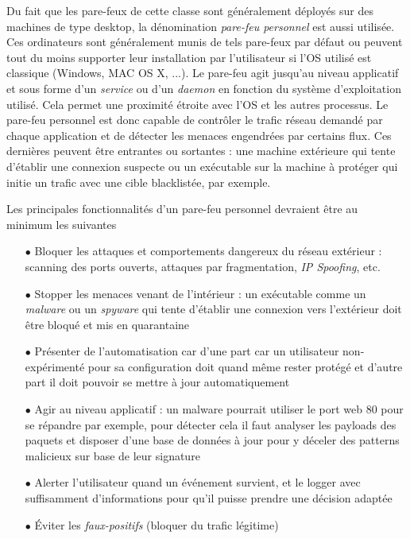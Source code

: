 \documentclass[]{article}
\begin{document}
\par Du fait que les pare-feux de cette classe sont généralement déployés sur des machines de type desktop, la dénomination \textit{pare-feu personnel} est aussi utilisée. Ces ordinateurs sont généralement munis de tels pare-feux par défaut ou peuvent tout du moins supporter leur installation par l'utilisateur si l'OS utilisé est classique (Windows, MAC OS X, ...). Le pare-feu agit jusqu'au niveau applicatif \cite{Kokko2017} et sous forme d'un \textit{service} ou d'un \textit{daemon} en fonction du système d'exploitation utilisé. Cela permet une proximité étroite avec l'OS et les autres processus. Le pare-feu personnel est donc capable de contrôler le trafic réseau demandé par chaque application et de détecter les menaces engendrées par certains flux. Ces dernières peuvent être entrantes ou sortantes : une machine extérieure qui tente d'établir une connexion suspecte ou un exécutable sur la machine à protéger qui initie un trafic avec une cible blacklistée, par exemple.\\


\par Les principales fonctionnalités d'un pare-feu personnel devraient être au minimum les suivantes \cite{Shimonski2013}
\vspace{0.1cm}
\begin{itemize}
\item[$\bullet$] Bloquer les attaques et comportements dangereux du réseau extérieur : scanning des ports ouverts, attaques par fragmentation, \textit{IP Spoofing}, etc.   
\vspace{0.2cm}
\item[$\bullet$] Stopper les menaces venant de l'intérieur : un exécutable comme un \textit{malware} ou un \textit{spyware} qui tente d'établir une connexion vers l'extérieur doit être bloqué et mis en quarantaine
\vspace{0.2cm}
\item[$\bullet$] Présenter de l'automatisation car d'une part car un utilisateur non-expérimenté pour sa configuration doit quand même rester protégé et d'autre part il doit pouvoir se mettre à jour automatiquement
\vspace{0.2cm}
\item[$\bullet$] Agir au niveau applicatif : un malware pourrait utiliser le port web 80 pour se répandre par exemple, pour détecter cela il faut analyser les payloads des paquets et disposer d'une base de données à jour pour y déceler des patterns malicieux sur base de leur signature
\vspace{0.2cm}
\item[$\bullet$] Alerter l'utilisateur quand un événement survient, et le logger avec suffisamment d'informations pour qu'il puisse prendre une décision adaptée
\vspace{0.2cm}
\item[$\bullet$] Éviter les \textit{faux-positifs} (bloquer du trafic légitime)
\end{itemize}
\vspace{0.5cm}
\end{document}
